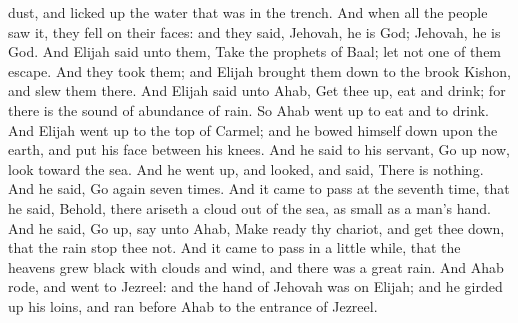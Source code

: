 dust, and licked up the water that was in the trench. And when all the people saw it, they fell on their faces: and they said, Jehovah, he is God; Jehovah, he is God. And Elijah said unto them, Take the prophets of Baal; let not one of them escape. And they took them; and Elijah brought them down to the brook Kishon, and slew them there.  And Elijah said unto Ahab, Get thee up, eat and drink; for there is the sound of abundance of rain. So Ahab went up to eat and to drink. And Elijah went up to the top of Carmel; and he bowed himself down upon the earth, and put his face between his knees. And he said to his servant, Go up now, look toward the sea. And he went up, and looked, and said, There is nothing. And he said, Go again seven times. And it came to pass at the seventh time, that he said, Behold, there ariseth a cloud out of the sea, as small as a man’s hand. And he said, Go up, say unto Ahab, Make ready thy chariot, and get thee down, that the rain stop thee not. And it came to pass in a little while, that the heavens grew black with clouds and wind, and there was a great rain. And Ahab rode, and went to Jezreel: and the hand of Jehovah was on Elijah; and he girded up his loins, and ran before Ahab to the entrance of Jezreel. 

